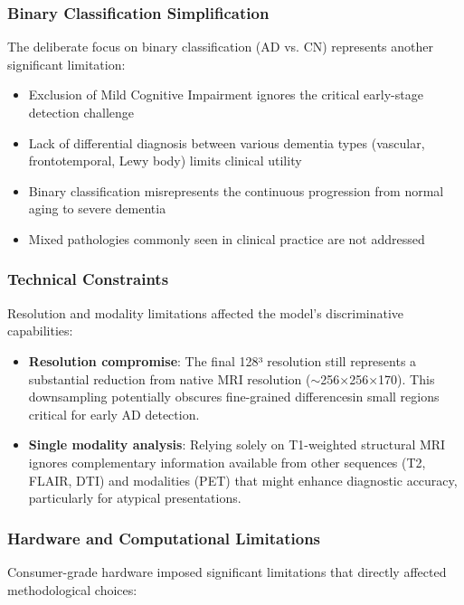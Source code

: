 \documentclass[12pt, a4paper]{article}
\begin{document}
\subsubsection{Binary Classification Simplification}

The deliberate focus on binary classification (AD vs. CN) represents another significant limitation:

\begin{itemize}
    \item Exclusion of Mild Cognitive Impairment ignores the critical early-stage detection challenge
    \item Lack of differential diagnosis between various dementia types (vascular, frontotemporal, Lewy body) limits clinical utility
    \item Binary classification misrepresents the continuous progression from normal aging to severe dementia
    \item Mixed pathologies commonly seen in clinical practice are not addressed
\end{itemize}

\subsubsection{Technical Constraints}

Resolution and modality limitations affected the model's discriminative capabilities:

\begin{itemize}
    \item \textbf{Resolution compromise}: The final 128³ resolution still represents a substantial reduction from native MRI resolution ($\sim$256×256×170). This downsampling potentially obscures fine-grained differencesin small regions critical for early AD detection.
    
    \item \textbf{Single modality analysis}: Relying solely on T1-weighted structural MRI ignores complementary information available from other sequences (T2, FLAIR, DTI) and modalities (PET) that might enhance diagnostic accuracy, particularly for atypical presentations.
\end{itemize}

\subsubsection{Hardware and Computational Limitations}

Consumer-grade hardware imposed significant limitations that directly affected methodological choices:
\end{document}
